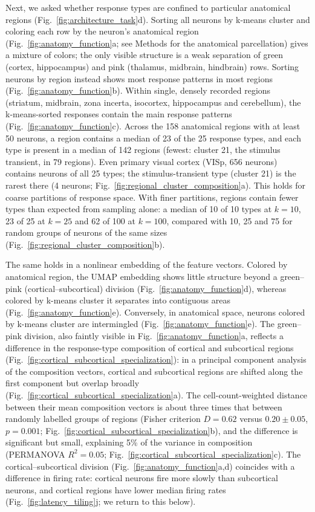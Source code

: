 \documentclass[10pt,lineno]{elife}
\begin{document}
Next, we asked whether response types are confined to particular anatomical regions (Fig.~\ref{fig:architecture_task}d). Sorting all neurons by k-means cluster and coloring each row by the neuron's anatomical region (Fig.~\ref{fig:anatomy_function}a; see Methods for the anatomical parcellation) gives a mixture of colors; the only visible structure is a weak separation of green (cortex, hippocampus) and pink (thalamus, midbrain, hindbrain) rows. Sorting neurons by region instead shows most response patterns in most regions (Fig.~\ref{fig:anatomy_function}b). Within single, densely recorded regions (striatum, midbrain, zona incerta, isocortex, hippocampus and cerebellum), the k-means-sorted responses contain the main response patterns (Fig.~\ref{fig:anatomy_function}c). Across the 158 anatomical regions with at least 50 neurons, a region contains a median of 23 of the 25 response types, and each type is present in a median of 142 regions (fewest: cluster 21, the stimulus transient, in 79 regions). Even primary visual cortex (VISp, 656 neurons) contains neurons of all 25 types; the stimulus-transient type (cluster 21) is the rarest there (4 neurons; Fig.~\ref{fig:regional_cluster_composition}a). This holds for coarse partitions of response space. With finer partitions, regions contain fewer types than expected from sampling alone: a median of 10 of 10 types at $k=10$, 23 of 25 at $k=25$ and 62 of 100 at $k=100$, compared with 10, 25 and 75 for random groups of neurons of the same sizes (Fig.~\ref{fig:regional_cluster_composition}b).

The same holds in a nonlinear embedding of the feature vectors. Colored by anatomical region, the UMAP embedding shows little structure beyond a green--pink (cortical--subcortical) division (Fig.~\ref{fig:anatomy_function}d), whereas colored by k-means cluster it separates into contiguous areas (Fig.~\ref{fig:anatomy_function}e). Conversely, in anatomical space, neurons colored by k-means cluster are intermingled (Fig.~\ref{fig:anatomy_function}e). The green--pink division, also faintly visible in Fig.~\ref{fig:anatomy_function}a, reflects a difference in the response-type composition of cortical and subcortical regions (Fig.~\ref{fig:cortical_subcortical_specialization}): in a principal component analysis of the composition vectors, cortical and subcortical regions are shifted along the first component but overlap broadly (Fig.~\ref{fig:cortical_subcortical_specialization}a). The cell-count-weighted distance between their mean composition vectors is about three times that between randomly labelled groups of regions (Fisher criterion $D=0.62$ versus $0.20\pm0.05$, $p=0.001$; Fig.~\ref{fig:cortical_subcortical_specialization}b), and the difference is significant but small, explaining 5\% of the variance in composition (PERMANOVA $R^2=0.05$; Fig.~\ref{fig:cortical_subcortical_specialization}c). The cortical--subcortical division (Fig.~\ref{fig:anatomy_function}a,d) coincides with a difference in firing rate: cortical neurons fire more slowly than subcortical neurons, and cortical regions have lower median firing rates (Fig.~\ref{fig:latency_tiling}j; we return to this below).
\end{document}
